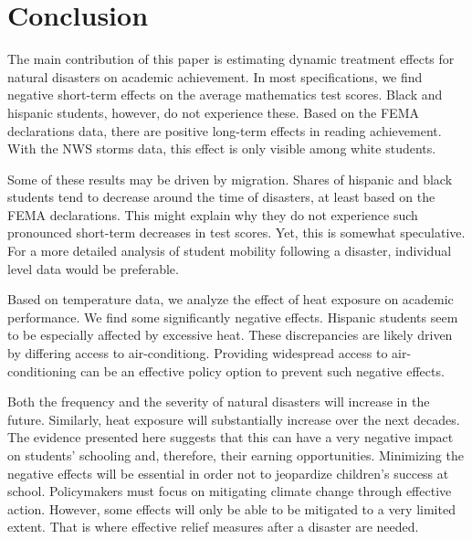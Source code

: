 \section{Conclusion} \label{Conclusion}

The main contribution of this paper is estimating dynamic treatment effects for natural disasters on academic achievement. In most specifications, we find negative short-term effects on the average mathematics test scores. Black and hispanic students, however, do not experience these. Based on the FEMA declarations data, there are positive long-term effects in reading achievement. With the NWS storms data, this effect is only visible among white students.

Some of these results may be driven by migration. Shares of hispanic and black students tend to decrease around the time of disasters, at least based on the FEMA declarations. This might explain why they do not experience such pronounced short-term decreases in test scores. Yet, this is somewhat speculative. For a more detailed analysis of student mobility following a disaster, individual level data would be preferable.

Based on temperature data, we analyze the effect of heat exposure on academic performance. We find some significantly negative effects. Hispanic students seem to be especially affected by excessive heat. These discrepancies are likely driven by differing access to air-conditiong. Providing widespread access to air-conditioning can be an effective policy option to prevent such negative effects.

Both the frequency and the severity of natural disasters will increase in the future. Similarly, heat exposure will substantially increase over the next decades. The evidence presented here suggests that this can have a very negative impact on students' schooling and, therefore, their earning opportunities. Minimizing the negative effects will be essential in order not to jeopardize children's success at school. Policymakers must focus on mitigating climate change through effective action. However, some effects will only be able to be mitigated to a very limited extent. That is where effective relief measures after a disaster are needed.




